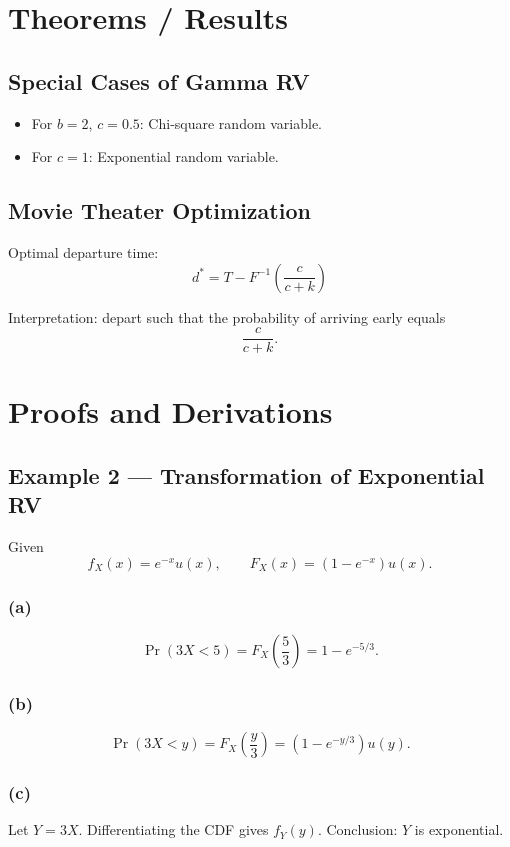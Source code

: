 \documentclass[11pt]{article}
\begin{document}
\section{Theorems / Results}

\subsection{Special Cases of Gamma RV}

\begin{itemize}
\item For $b=2$, $c=0.5$: Chi-square random variable.
\item For $c=1$: Exponential random variable.
\end{itemize}

\subsection{Movie Theater Optimization}

Optimal departure time:
\[
d^* = T - F^{-1}\!\left(\frac{c}{c+k}\right)
\]

Interpretation: depart such that the probability of arriving early equals
\[
\frac{c}{c+k}.
\]

\section{Proofs and Derivations}

\subsection{Example 2 — Transformation of Exponential RV}

Given
\[
f_X(x)=e^{-x}u(x), \qquad F_X(x)=\left(1-e^{-x}\right)u(x).
\]

\subsubsection*{(a)}
\[
\Pr(3X<5)=F_X\!\left(\frac53\right)=1-e^{-5/3}.
\]

\subsubsection*{(b)}
\[
\Pr(3X<y)=F_X\!\left(\frac y3\right)=\left(1-e^{-y/3}\right)u(y).
\]

\subsubsection*{(c)}
Let $Y=3X$. Differentiating the CDF gives $f_Y(y)$.
Conclusion: $Y$ is exponential.
\end{document}
